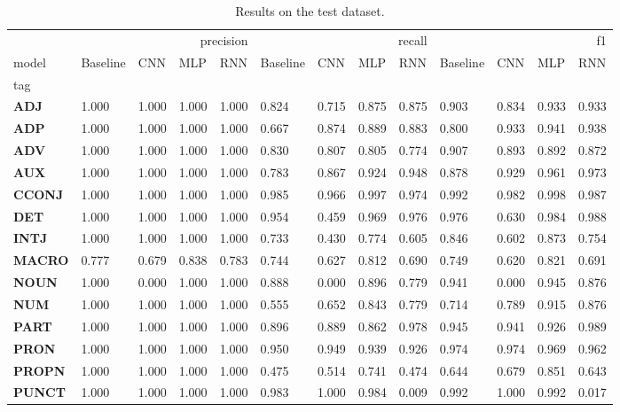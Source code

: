 \begin{table}
\caption{Results on the test dataset.}
\label{tab::ex_2_test}
\begin{tabular}{|l||l||l||l||l||l||l||l||l||l||l||l||l|}
\toprule
 & \multicolumn{4}{r}{precision} & \multicolumn{4}{r}{recall} & \multicolumn{4}{r}{f1} \\
model & Baseline & CNN & MLP & RNN & Baseline & CNN & MLP & RNN & Baseline & CNN & MLP & RNN \\
tag &  &  &  &  &  &  &  &  &  &  &  &  \\
\midrule
\textbf{ADJ} & 1.000 & 1.000 & 1.000 & 1.000 & 0.824 & 0.715 & 0.875 & 0.875 & 0.903 & 0.834 & 0.933 & 0.933 \\
\textbf{ADP} & 1.000 & 1.000 & 1.000 & 1.000 & 0.667 & 0.874 & 0.889 & 0.883 & 0.800 & 0.933 & 0.941 & 0.938 \\
\textbf{ADV} & 1.000 & 1.000 & 1.000 & 1.000 & 0.830 & 0.807 & 0.805 & 0.774 & 0.907 & 0.893 & 0.892 & 0.872 \\
\textbf{AUX} & 1.000 & 1.000 & 1.000 & 1.000 & 0.783 & 0.867 & 0.924 & 0.948 & 0.878 & 0.929 & 0.961 & 0.973 \\
\textbf{CCONJ} & 1.000 & 1.000 & 1.000 & 1.000 & 0.985 & 0.966 & 0.997 & 0.974 & 0.992 & 0.982 & 0.998 & 0.987 \\
\textbf{DET} & 1.000 & 1.000 & 1.000 & 1.000 & 0.954 & 0.459 & 0.969 & 0.976 & 0.976 & 0.630 & 0.984 & 0.988 \\
\textbf{INTJ} & 1.000 & 1.000 & 1.000 & 1.000 & 0.733 & 0.430 & 0.774 & 0.605 & 0.846 & 0.602 & 0.873 & 0.754 \\
\textbf{MACRO} & 0.777 & 0.679 & 0.838 & 0.783 & 0.744 & 0.627 & 0.812 & 0.690 & 0.749 & 0.620 & 0.821 & 0.691 \\
\textbf{NOUN} & 1.000 & 0.000 & 1.000 & 1.000 & 0.888 & 0.000 & 0.896 & 0.779 & 0.941 & 0.000 & 0.945 & 0.876 \\
\textbf{NUM} & 1.000 & 1.000 & 1.000 & 1.000 & 0.555 & 0.652 & 0.843 & 0.779 & 0.714 & 0.789 & 0.915 & 0.876 \\
\textbf{PART} & 1.000 & 1.000 & 1.000 & 1.000 & 0.896 & 0.889 & 0.862 & 0.978 & 0.945 & 0.941 & 0.926 & 0.989 \\
\textbf{PRON} & 1.000 & 1.000 & 1.000 & 1.000 & 0.950 & 0.949 & 0.939 & 0.926 & 0.974 & 0.974 & 0.969 & 0.962 \\
\textbf{PROPN} & 1.000 & 1.000 & 1.000 & 1.000 & 0.475 & 0.514 & 0.741 & 0.474 & 0.644 & 0.679 & 0.851 & 0.643 \\
\textbf{PUNCT} & 1.000 & 1.000 & 1.000 & 1.000 & 0.983 & 1.000 & 0.984 & 0.009 & 0.992 & 1.000 & 0.992 & 0.017 \\

\end{tabular}
\end{table}
